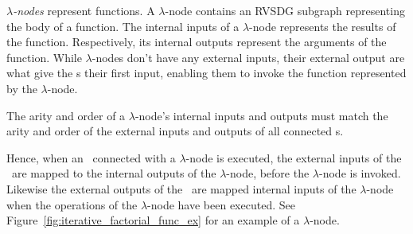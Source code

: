 \begin{itemize}
\textit{$\lambda$-nodes} represent functions. A $\lambda$-node contains an RVSDG
subgraph representing the body of a function. The internal inputs of a
$\lambda$-node represents the results of the function. Respectively, its
internal outputs represent the arguments of the function. While $\lambda$-nodes
don't have any external inputs, their external output are what give the
\applyNode s their first input, enabling them to invoke the function represented
by the $\lambda$-node.

The arity and order of a $\lambda$-node's internal inputs and outputs must match
the arity and order of the external inputs and outputs of all connected
\applyNode s.

Hence, when an \applyNode~connected with a $\lambda$-node is executed, the
external inputs of the \applyNode~are mapped to the internal outputs of the
$\lambda$-node, before the $\lambda$-node is invoked. Likewise the external
outputs of the \applyNode~are mapped internal inputs of the $\lambda$-node when
the operations of the $\lambda$-node have been executed. See
Figure~\ref{fig:iterative_factorial_func_ex} for an example of a $\lambda$-node.


\end{itemize}
